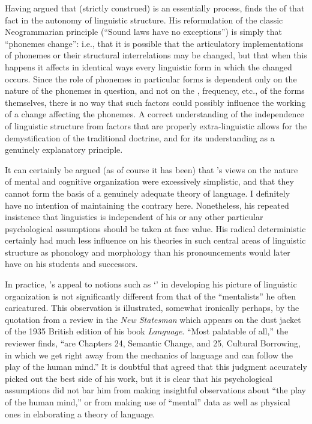 Having argued that  (strictly construed) is an essentially
 process, {\Bloomfield} finds the  of that fact in the
autonomy of linguistic structure. His reformulation of the classic
Neogrammarian principle (``Sound laws have no exceptions'') is simply
that ``phonemes change'': i.e., that it is possible that the
articulatory implementations of phonemes or their structural
interrelations may be changed, but that when this happens it affects
in identical ways every linguistic form in which the changed 
occurs. Since the role of phonemes in particular forms is dependent
only on the nature of the phonemes in question, and not on the
, frequency, etc., of the forms themselves, there is no way
that such factors could possibly influence the working of a change
affecting the phonemes. A correct understanding of the independence of
linguistic structure from factors that are properly extra-linguistic
allows for the demystification of the traditional doctrine, and for
its understanding as a genuinely explanatory principle.

It can certainly be argued (as of course it has been) that
{\Bloomfield}'s views on the nature of mental and cognitive organization
were excessively simplistic, and that they cannot form the basis of a
genuinely adequate theory of language. I definitely have no intention
of maintaining the contrary here. Nonetheless, his repeated insistence
that linguistics is independent of his or any other particular
psychological assumptions should be taken at face value. His radical
deterministic  certainly had much less influence on his
theories in such central areas of linguistic structure as phonology
and morphology than his pronouncements would later have on his
students and successors.

In practice, {\Bloomfield}'s appeal to notions such as `' in
developing his picture of linguistic organization is not significantly
different from that of the ``mentalists'' he often caricatured. This
observation is illustrated, somewhat ironically perhaps, by the
quotation from a review in the \textsl{New Statesman} which appears on
the dust jacket of the 1935 British edition of his book
\textsl{Language}. ``Most palatable of all,'' the reviewer finds, ``are
Chapters 24, Semantic Change, and 25, Cultural Borrowing, in which we
get right away from the mechanics of language and can follow the play
of the human mind.'' It is doubtful that {\Bloomfield} agreed that this
judgment accurately picked out the best side of his work, but it is
clear that his psychological assumptions did not bar him from making
insightful observations about ``the play of the human mind,'' or from
making use of ``mental'' data as well as physical ones in elaborating a
theory of language.

